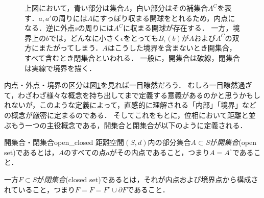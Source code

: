 \documentclass[11pt,a4paper, dvipdfmx]{jsarticle}
\begin{document}

\begin{figure}[htbp]
 \begin{center}
 \end{center}
 \caption{上図において，青い部分は集合$A$，白い部分はその補集合$A^C$を表す．$a, a'$の周りには$A$にすっぽり収まる開球をとれるため，内点になる．逆に外点$s$の周りには$A^C$に収まる開球が存在する．
 一方，境界上の$b$では，どんなに小さく$\epsilon$をとっても$B_\epsilon(b)$が$A$および$A^C$の双方にまたがってしまう．$A$はこうした境界を含まないとき開集合，すべて含むとき閉集合といわれる．
 一般に，開集合は破線，閉集合は実線で境界を描く．}
 \label{fig:openset}
\end{figure}

内点・外点・境界の区分は図\ref{fig:openset}を見れば一目瞭然だろう．
むしろ一目瞭然過ぎて，わざわざ様々な概念を持ち出してまで定義する意義があるのかと思うかもしれないが，このような定義によって，直感的に理解される「内部」「境界」などの概念が厳密に定まるのである．
そしてこれをもとに，位相において距離と並ぶもう一つの主役概念である，開集合と閉集合が以下のように定義される．

\begin{dfn}{開集合・閉集合}{open_closed}
  距離空間$(S, d)$内の部分集合$A \subset S$が\emph{開集合}(open set)であるとは，$A$のすべての点$a$がその内点であること，つまり$A = A^\circ$であること．

  一方$F \subset S$が\emph{閉集合}(closed set)であるとは，それが内点および境界点から構成されていること，つまり$F = \bar{F} = F^\circ \cup \partial F$であること．
\end{dfn}
\end{document}
